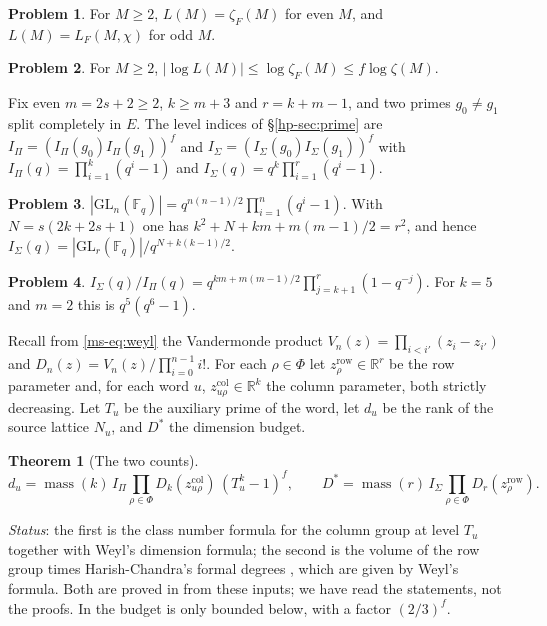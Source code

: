 \documentclass[reqno]{amsart}
\theoremstyle{definition}
\newtheorem{problem}{Problem}[section]
\theoremstyle{plain}
\newtheorem{theorem}{Theorem}[section]
\theoremstyle{remark}
\newcommand{\mass}{\operatorname{mass}}
\newcommand{\GL}{\mathrm{GL}}
\newcommand{\F}{\mathbb{F}}
\newcommand{\zr}{z^{\mathrm{row}}}
\newcommand{\zc}{z^{\mathrm{col}}}
\begin{document}
\begin{problem}\label{pr:euler}
For $M\ge2$, $L(M)=\zeta_F(M)$ for even $M$, and $L(M)=L_F(M,\chi)$ for odd $M$.
\end{problem}

\begin{problem}\label{pr:Lbound}
For $M\ge2$, $|\log L(M)|\le\log\zeta_F(M)\le f\log\zeta(M)$.
\end{problem}

Fix even $m=2s+2\ge2$, $k\ge m+3$ and $r=k+m-1$, and two primes
$g_0\ne g_1$ split completely in $E$.  The level indices of
\S\ref{hp-sec:prime} are $I_\Pi=(I_\Pi(g_0)I_\Pi(g_1))^f$ and
$I_\Sigma=(I_\Sigma(g_0)I_\Sigma(g_1))^f$ with
$I_\Pi(q)=\prod_{i=1}^k(q^i-1)$ and
$I_\Sigma(q)=q^k\prod_{i=1}^r(q^i-1)$.

\begin{problem}\label{pr:glcard}
$|\GL_n(\F_q)|=q^{n(n-1)/2}\prod_{i=1}^n(q^i-1)$.  With
$N=s(2k+2s+1)$ one has $k^2+N+km+m(m-1)/2=r^2$, and hence
$I_\Sigma(q)=|\GL_r(\F_q)|/q^{N+k(k-1)/2}$.
\end{problem}

\begin{problem}\label{pr:index}
$I_\Sigma(q)/I_\Pi(q)=q^{km+m(m-1)/2}\prod_{j=k+1}^{r}(1-q^{-j})$.
For $k=5$ and $m=2$ this is $q^5(q^6-1)$.
\end{problem}

Recall from \eqref{ms-eq:weyl} the Vandermonde product
$V_n(z)=\prod_{i<i'}(z_i-z_{i'})$ and $D_n(z)=V_n(z)/\prod_{i=0}^{n-1}i!$.
For each $\rho\in\Phi$ let $\zr_\rho\in\mathbb R^r$ be the row parameter
and, for each word $u$, $\zc_{u\rho}\in\mathbb R^k$ the column parameter,
both strictly decreasing.  Let $T_u$ be the auxiliary prime of the word,
let $d_u$ be the rank of the source lattice $N_u$, and $D^*$ the
dimension budget.

\begin{theorem}[The two counts]\label{in:counts}
\[
 d_u=\mass(k)\,I_\Pi\prod_{\rho\in\Phi}D_k(\zc_{u\rho})\,(T_u^k-1)^f,
 \qquad
 D^*=\mass(r)\,I_\Sigma\prod_{\rho\in\Phi}D_r(\zr_\rho).
\]
\end{theorem}
\noindent\emph{Status}: the first is the class number formula for the column
group at level $T_u$ together with Weyl's dimension formula; the second is
the volume of the row group times Harish-Chandra's formal degrees
\cite{HC}, which are given by Weyl's formula.  Both are proved in
\cite{Lean} from these inputs; we have read the statements, not the
proofs.  In \cite[Hyp.~15.23]{Adr} the budget is only bounded below, with
a factor $(2/3)^f$.
\end{document}

